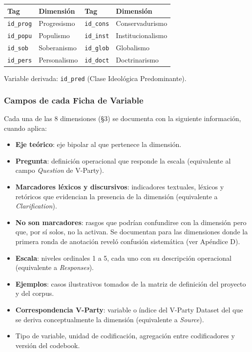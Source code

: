 \documentclass[11pt,letterpaper]{article}
\begin{document}
\begin{longtable}{@{}p{2.2cm}p{5.0cm}p{2.2cm}p{5.0cm}@{}}
\toprule
\textbf{Tag} & \textbf{Dimensión} & \textbf{Tag} & \textbf{Dimensión}\\
\midrule\endhead
\texttt{id\_prog} & Progresismo      & \texttt{id\_cons} & Conservadurismo\\
\texttt{id\_popu} & Populismo        & \texttt{id\_inst} & Institucionalismo\\
\texttt{id\_sob}  & Soberanismo      & \texttt{id\_glob} & Globalismo\\
\texttt{id\_pers} & Personalismo     & \texttt{id\_doct} & Doctrinarismo\\
\bottomrule
\end{longtable}
Variable derivada: \texttt{id\_pred} (Clase Ideológica Predominante).

\subsubsection{Campos de cada Ficha de Variable}
Cada una de las 8 dimensiones (§3) se documenta con la siguiente información, cuando aplica:
\begin{itemize}
\item \textbf{Eje teórico}: eje bipolar al que pertenece la dimensión.
\item \textbf{Pregunta}: definición operacional que responde la escala (equivalente al campo \emph{Question}
de V-Party).
\item \textbf{Marcadores léxicos y discursivos}: indicadores textuales, léxicos y retóricos que evidencian la
presencia de la dimensión (equivalente a \emph{Clarification}).
\item \textbf{No son marcadores}: rasgos que podrían confundirse con la dimensión pero que, por sí solos, no
la activan. Se documentan para las dimensiones donde la primera ronda de anotación reveló confusión
sistemática (ver Apéndice D).
\item \textbf{Escala}: niveles ordinales 1 a 5, cada uno con su descripción operacional (equivalente a
\emph{Responses}).
\item \textbf{Ejemplos}: casos ilustrativos tomados de la matriz de definición del proyecto y del corpus.
\item \textbf{Correspondencia V-Party}: variable o índice del V-Party Dataset del que se deriva
conceptualmente la dimensión (equivalente a \emph{Source}).
\item Tipo de variable, unidad de codificación, agregación entre codificadores y versión del codebook.
\end{itemize}
\end{document}
